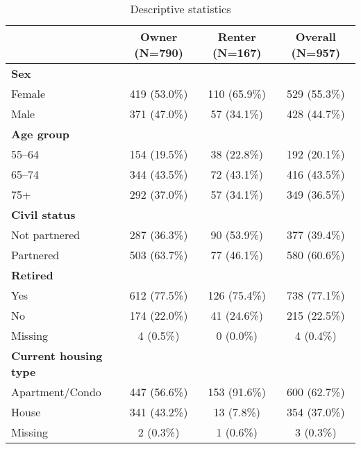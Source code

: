 \begin{table}[h]
\centering
\caption{Descriptive statistics}
\label{tab:desc}
\begin{threeparttable}
\begin{tabular}{lccc}
\scriptsize
\toprule
 & \textbf{Owner (N=790)} & \textbf{Renter (N=167)} & \textbf{Overall (N=957)} \\
\midrule
\textbf{Sex} \\
\hspace{1em}Female & 419 (53.0\%) & 110 (65.9\%) & 529 (55.3\%) \\
\hspace{1em}Male & 371 (47.0\%) & 57 (34.1\%) & 428 (44.7\%) \\

\textbf{Age group} \\
\hspace{1em}55--64 & 154 (19.5\%) & 38 (22.8\%) & 192 (20.1\%) \\
\hspace{1em}65--74 & 344 (43.5\%) & 72 (43.1\%) & 416 (43.5\%) \\
\hspace{1em}75+ & 292 (37.0\%) & 57 (34.1\%) & 349 (36.5\%) \\

\textbf{Civil status} \\
\hspace{1em}Not partnered & 287 (36.3\%) & 90 (53.9\%) & 377 (39.4\%) \\
\hspace{1em}Partnered & 503 (63.7\%) & 77 (46.1\%) & 580 (60.6\%) \\

\textbf{Retired} \\
\hspace{1em}Yes & 612 (77.5\%) & 126 (75.4\%) & 738 (77.1\%) \\
\hspace{1em}No & 174 (22.0\%) & 41 (24.6\%) & 215 (22.5\%) \\
\hspace{1em}Missing & 4 (0.5\%) & 0 (0.0\%) & 4 (0.4\%) \\

\textbf{Current housing type} \\
\hspace{1em}Apartment/Condo & 447 (56.6\%) & 153 (91.6\%) & 600 (62.7\%) \\
\hspace{1em}House & 341 (43.2\%) & 13 (7.8\%) & 354 (37.0\%) \\
\hspace{1em}Missing & 2 (0.3\%) & 1 (0.6\%) & 3 (0.3\%) \\


\end{tabular}
\end{threeparttable}
\end{table}
